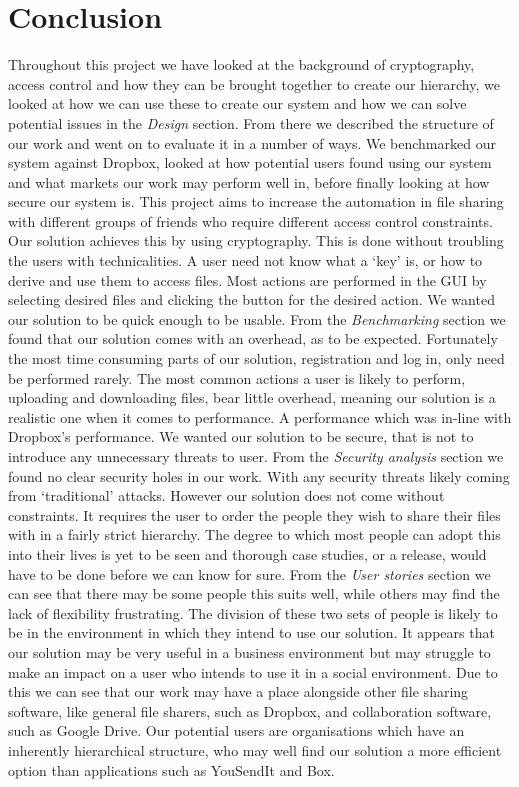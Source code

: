 \documentclass[12pt, titlepage]{article}
\begin{document}
\section{Conclusion}
Throughout this project we have looked at the background of cryptography, access control and how they can be brought together to create our hierarchy, we looked at how we can use these to create our system and how we can solve potential issues in the \textit{Design} section. From there we described the structure of our work and went on to evaluate it in a number of ways. We benchmarked our system against Dropbox, looked at how potential users found using our system and what markets our work may perform well in, before finally looking at how secure our system is.
\newline \indent This project aims to increase the automation in file sharing with different groups of friends who require different access control constraints. Our solution achieves this by using cryptography. This is done without troubling the users with technicalities. A user need not know what a `key' is, or how to derive and use them to access files. Most actions are performed in the GUI by selecting desired files and clicking the button for the desired action.
\newline \indent We wanted our solution to be quick enough to be usable. From the \textit{Benchmarking} section we found that our solution comes with an overhead, as to be expected. Fortunately the most time consuming parts of our solution, registration and log in, only need be performed rarely. The most common actions a user is likely to perform, uploading and downloading files, bear little overhead, meaning our solution is a realistic one when it comes to performance. A performance which was in-line with Dropbox's performance.
\newline \indent We wanted our solution to be secure, that is not to introduce any unnecessary threats to user. From the \textit{Security analysis} section we found no clear security holes in our work. With any security threats likely coming from `traditional' attacks.
\newline \indent However our solution does not come without constraints. It requires the user to order the people they wish to share their files with in a fairly strict hierarchy. The degree to which most people can adopt this into their lives is yet to be seen and thorough case studies, or a release, would have to be done before we can know for sure. From the \textit{User stories} section we can see that there may be some people this suits well, while others may find the lack of flexibility frustrating. The division of these two sets of people is likely to be in the environment in which they intend to use our solution. It appears that our solution may be very useful in a business environment but may struggle to make an impact on a user who intends to use it in a social environment. Due to this we can see that our work may have a place alongside other file sharing software, like general file sharers, such as Dropbox, and collaboration software, such as Google Drive. Our potential users are organisations which have an inherently hierarchical structure, who may well find our solution a more efficient option than applications such as YouSendIt and Box.
\end{document}
